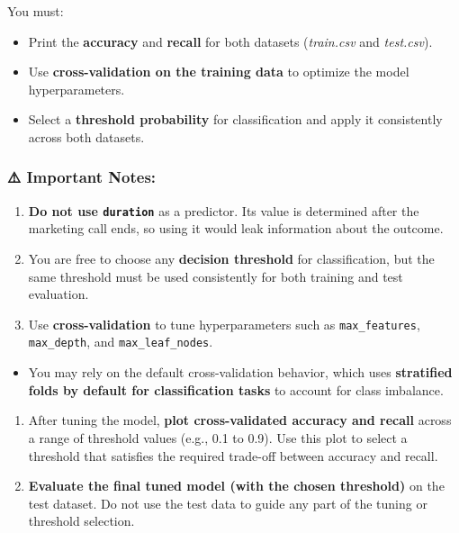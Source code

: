 \documentclass[
  letterpaper,
  DIV=11,
  numbers=noendperiod]{scrreprt}
\providecommand{\tightlist}{%
  \setlength{\itemsep}{0pt}\setlength{\parskip}{0pt}}\usepackage{longtable,booktabs,array}
\begin{document}
You must:

\begin{itemize}
\tightlist
\item
  Print the \textbf{accuracy} and \textbf{recall} for both datasets
  (\emph{train.csv} and \emph{test.csv}).
\item
  Use \textbf{cross-validation on the training data} to optimize the
  model hyperparameters.
\item
  Select a \textbf{threshold probability} for classification and apply
  it consistently across both datasets.
\end{itemize}

\subsubsection{⚠️ Important Notes:}\label{important-notes}

\begin{enumerate}
\def\labelenumi{\roman{enumi}.}
\item
  \textbf{Do not use \texttt{duration}} as a predictor. Its value is
  determined after the marketing call ends, so using it would leak
  information about the outcome.
\item
  You are free to choose any \textbf{decision threshold} for
  classification, but the same threshold must be used consistently for
  both training and test evaluation.
\item
  Use \textbf{cross-validation} to tune hyperparameters such as
  \texttt{max\_features}, \texttt{max\_depth}, and
  \texttt{max\_leaf\_nodes}.\\
\end{enumerate}

\begin{itemize}
\tightlist
\item
  You may rely on the default cross-validation behavior, which uses
  \textbf{stratified folds by default for classification tasks} to
  account for class imbalance.
\end{itemize}

\begin{enumerate}
\def\labelenumi{\roman{enumi}.}
\setcounter{enumi}{3}
\item
  After tuning the model, \textbf{plot cross-validated accuracy and
  recall} across a range of threshold values (e.g., 0.1 to 0.9). Use
  this plot to select a threshold that satisfies the required trade-off
  between accuracy and recall.
\item
  \textbf{Evaluate the final tuned model (with the chosen threshold)} on
  the test dataset. Do not use the test data to guide any part of the
  tuning or threshold selection.
\end{enumerate}
\end{document}
